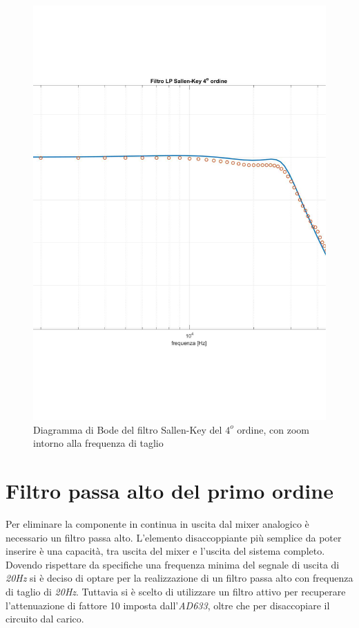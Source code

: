 \documentclass[titlepage]{report}
\begin{document}
	\begin{figure}[H]
		\centering
		\includegraphics[scale=0.7]{Immagini/zoom_lp4.pdf}
		\caption{Diagramma di Bode del filtro Sallen-Key del $4^o$ ordine, con zoom intorno alla frequenza di taglio}
		\label{fig:BODELp4Realzoom}
	\end{figure}
	

\newpage
\section{Filtro passa alto del primo ordine}
\label{sec:filtro_hp1}
	Per eliminare la componente in continua in uscita dal mixer analogico è necessario un filtro passa alto. L'elemento disaccoppiante più semplice da poter inserire è una capacità, tra uscita del mixer e l'uscita del sistema completo.
	Dovendo rispettare da specifiche una frequenza minima del segnale di uscita di \textit{20Hz} si è deciso di optare per la realizzazione di un filtro passa alto con frequenza di taglio di \textit{20Hz}. Tuttavia si è scelto di utilizzare un filtro attivo per recuperare l'attenuazione di fattore 10 imposta dall'\textit{AD633}, oltre che per disaccopiare il circuito dal carico.
	
\end{document}
